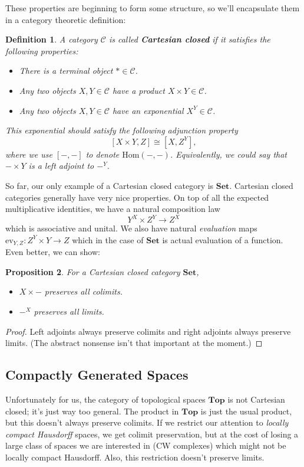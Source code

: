 \documentclass{article}
\providecommand{\Hom}{\mathrm{Hom}}
\providecommand{\CC}{\mathscr{C}}
\newtheorem{definition}{Definition}[subsection]
\newtheorem{proposition}[definition]{Proposition}
\begin{document}
These properties are beginning to form some structure, so we'll encapsulate them in a category theoretic definition:

\begin{definition}
  A category $\CC$ is called \textbf{Cartesian closed} if it satisfies the following properties:
  \begin{itemize}
    \item There is a terminal object $*\in \CC$.
    \item Any two objects $X,Y \in \CC$ have a product $X\times Y\in \CC$.
    \item Any two objects $X,Y \in \CC$ have an exponential $X^Y\in \CC$.
  \end{itemize}
  This exponential should satisfy the following adjunction property
  \[ [X\times Y, Z] \cong [X, Z^Y],\]
  where we use $[-,-]$ to denote $\Hom(-,-)$. Equivalently, we could say that $-\times Y$ is a left adjoint to $-^Y$.
\end{definition}

So far, our only example of a Cartesian closed category is $\mathbf{Set}$. Cartesian closed categories generally have very nice properties. On top of all the expected multiplicative identities, we have a natural composition law
\[Y^X \times Z^Y \to Z^X\]
which is associative and unital. We also have natural \emph{evaluation} maps $\textrm{ev}_{Y, Z} : Z^Y  \times Y \to Z$ which in the case of $\textbf{Set}$ is actual evaluation of a function. Even better, we can show:

\begin{proposition}
  For a Cartesian closed category $\mathbf{Set}$,
  \begin{itemize}
    \item $X\times -$ preserves all colimits.
    \item $-^X$ preserves all limits.
  \end{itemize}
\end{proposition}
\begin{proof}
  Left adjoints always preserve colimits and right adjoints always preserve limits. (The abstract nonsense isn't that important at the moment.)
\end{proof}

\subsection{Compactly Generated Spaces}

Unfortunately for us, the category of topological spaces $\mathbf{Top}$ is not Cartesian closed; it's just way too general. The product in $\mathbf{Top}$ is just the usual product, but this doesn't always preserve colimits. If we restrict our attention to \emph{locally compact Hausdorff} spaces, we get colimit preservation, but at the cost of losing a large class of spaces we are interested in (CW complexes) which might not be locally compact Hausdorff. Also, this restriction doesn't preserve limits.
\end{document}
